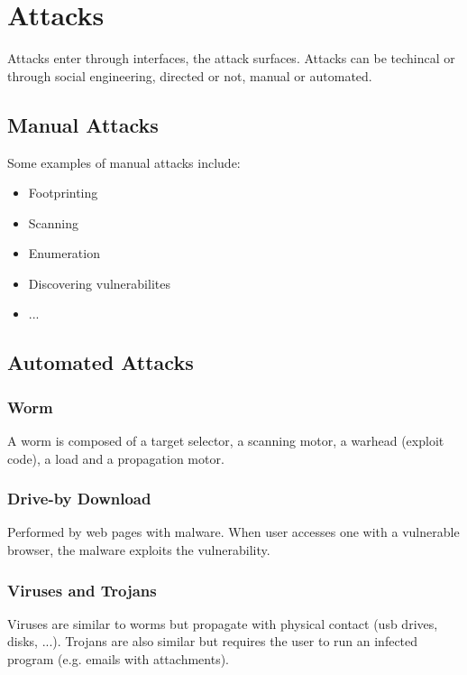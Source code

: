 \documentclass[10pt,a4paper]{report}
\begin{document}
\section{Attacks}
Attacks enter through interfaces, the attack surfaces. Attacks can be techincal or through social engineering, directed or not, manual or automated.
\subsection{Manual Attacks}
Some examples of manual attacks include:
\begin{itemize}
\item Footprinting
\item Scanning
\item Enumeration
\item Discovering vulnerabilites
\item ...
\end{itemize}
\subsection{Automated Attacks}
\subsubsection{Worm}
A worm is composed of a target selector, a scanning motor, a warhead (exploit code), a load and a propagation motor.
\subsubsection{Drive-by Download}
Performed by web pages with malware. When user accesses one with a vulnerable browser, the malware exploits the vulnerability.
\subsubsection{Viruses and Trojans}
Viruses are similar to worms but propagate with physical contact (usb drives, disks, ...). Trojans are also similar but requires the user to run an infected program (e.g. emails with attachments).
\end{document}
